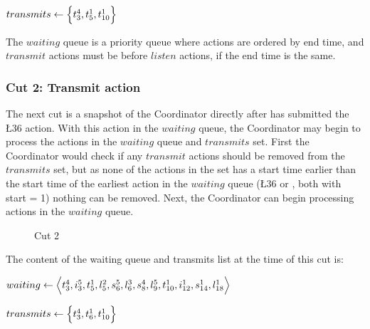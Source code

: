 $transmits \leftarrow \Big\{ t^{4}_{3}, t^{1}_{5}, t^{1}_{10} \Big\}$ \smallbreak

The $waiting$ queue is a priority queue where actions are ordered by end time, and $transmit$ actions must be before $listen$ actions, if the end time is the same.

\subsubsection{Cut 2: Transmit action}
The next cut is a snapshot of the Coordinator directly after  has submitted the \L{3}{6} action. With this action in the $waiting$ queue, the Coordinator may begin to process the actions in the $waiting$ queue and $transmits$ set. First the Coordinator would check if any $transmit$ actions should be removed from the $transmits$ set, but as none of the actions in the set has a start time earlier than the start time of the earliest action in the $waiting$ queue (\L{3}{6} or , both with start = 1) nothing can be removed. Next, the Coordinator can begin processing actions in the $waiting$ queue. %

\begin{figure}[H]
    \centering

    \caption{Cut 2}\label{tikz:coordinatormsc2}
\end{figure}

The content of the waiting queue and transmits list at the time of this cut is: \smallbreak

$waiting \leftarrow \Big\langle%
    \T{4}{3}, %
    \I{5}{3}, %
    \T{1}{5}, %
    \L{2}{5}, %
    \S{5}{6}, %
    \L{3}{6}, %
    \S{4}{8}, %
    \L{5}{9}, %
    \T{1}{10}, %
    \I{1}{12}, %
    \S{1}{14}, %
    \L{1}{18} %
    \Big\rangle$

$transmits \leftarrow \Big\{ t^{4}_{3}, t^{1}_{6}, t^{1}_{10} \Big\}$ \smallbreak

